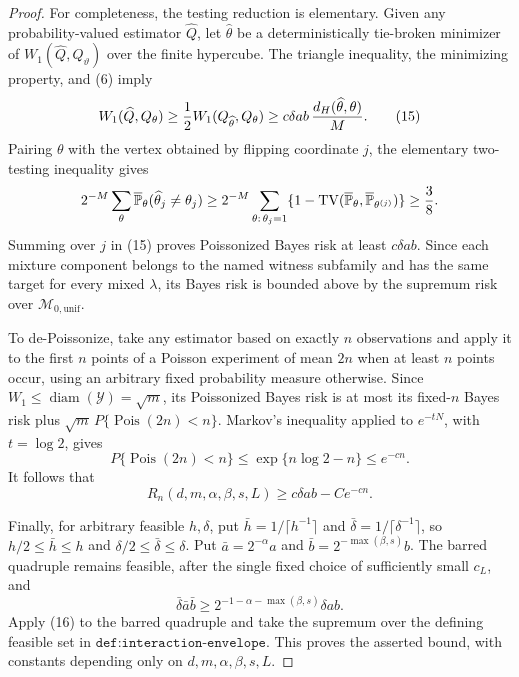 \documentclass{article}
\begin{document}
\begin{proof}
For completeness, the testing reduction is elementary.  Given any probability-valued estimator \(\widehat Q\), let \(\widehat\theta\) be a deterministically tie-broken minimizer of \(W_1(\widehat Q,Q_\vartheta)\) over the finite hypercube.  The triangle inequality, the minimizing property, and (6) imply
\[
 W_1(\widehat Q,Q_\theta)
 \geq {1\over2}W_1(Q_{\widehat\theta},Q_\theta)
 \geq c\delta ab\,{d_H(\widehat\theta,\theta)\over M}.
 \tag{15}
\]
Pairing \(\theta\) with the vertex obtained by flipping coordinate \(j\), the elementary two-testing inequality gives
\[
 2^{-M}\sum_\theta
 \overline{\mathbb P}_\theta(\widehat\theta_j\neq\theta_j)
 \geq 2^{-M}\sum_{\theta:\,\theta_j=1}
       \{1-\operatorname{TV}(\overline{\mathbb P}_\theta,
                  \overline{\mathbb P}_{\theta^{(j)}})\}
 \geq {3\over8}.
\]
Summing over \(j\) in (15) proves Poissonized Bayes risk at least \(c\delta ab\).  Since each mixture component belongs to the named witness subfamily and has the same target for every mixed \(\lambda\), its Bayes risk is bounded above by the supremum risk over \(\mathcal M_{0,\mathrm{unif}}\).

To de-Poissonize, take any estimator based on exactly \(n\) observations and apply it to the first \(n\) points of a Poisson experiment of mean \(2n\) when at least \(n\) points occur, using an arbitrary fixed probability measure otherwise.  Since \(W_1\leq\operatorname{diam}(\mathcal Y)=\sqrt m\), its Poissonized Bayes risk is at most its fixed-\(n\) Bayes risk plus \(\sqrt m\,P\{\operatorname{Pois}(2n)<n\}\).  Markov's inequality applied to \(e^{-tN}\), with \(t=\log2\), gives
\[
 P\{\operatorname{Pois}(2n)<n\}
 \leq\exp\{n\log2-n\} \leq e^{-cn}.
\]
It follows that
\[
 R_n(d,m,\alpha,\beta,s,L)\geq c\delta ab-Ce^{-cn}.
 \tag{16}
\]

Finally, for arbitrary feasible \(h,\delta\), put \(\bar h=1/\lceil h^{-1}\rceil\) and \(\bar\delta=1/\lceil\delta^{-1}\rceil\), so \(h/2\leq\bar h\leq h\) and \(\delta/2\leq\bar\delta\leq\delta\).  Put \(\bar a=2^{-\alpha}a\) and \(\bar b=2^{-\max(\beta,s)}b\).  The barred quadruple remains feasible, after the single fixed choice of sufficiently small \(c_L\), and
\[
 \bar\delta\bar a\bar b
 \geq2^{-1-\alpha-\max(\beta,s)}\delta ab.
\]
Apply (16) to the barred quadruple and take the supremum over the defining feasible set in \(\texttt{def:interaction-envelope}\).  This proves the asserted bound, with constants depending only on \(d,m,\alpha,\beta,s,L\).
\end{proof}
\end{document}
